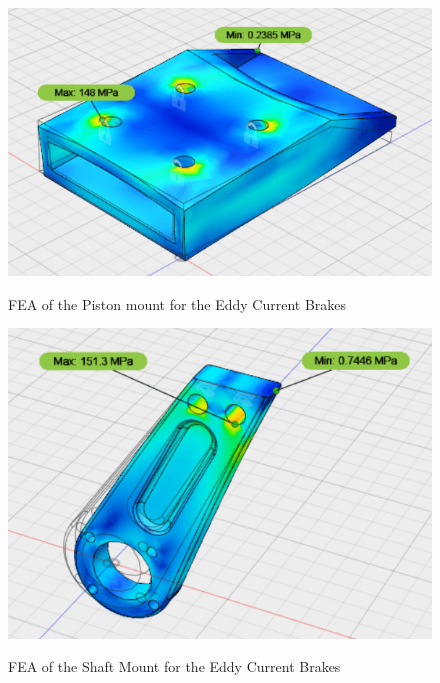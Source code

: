 \documentclass[main.tex]{subfiles}
\begin{document}
    \begin{figure}
    	\centering
        \includegraphics[width =\linewidth]{images/ECPistonMount}
        \label{fig:ECPiston}
        \caption{FEA of the Piston mount for the Eddy Current Brakes}
    \end{figure}
    
    \begin{figure}
    	\centering
        \includegraphics[width = \linewidth]{images/ShaftMount}
        \label{fig:ShafttMount}
        \caption{FEA of the Shaft Mount for the Eddy Current Brakes}
    \end{figure}
    
\end{document}
